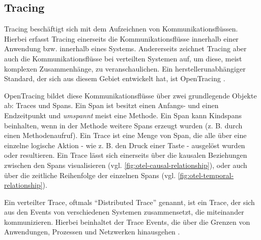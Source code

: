 
\subsection{Tracing}
\label{sec:tracing}

Tracing beschäftigt sich mit dem Aufzeichnen von Kommunikationsflüssen. Hierbei erfasst Tracing einerseits die Kommunikationsflüsse innerhalb einer Anwendung bzw. innerhalb eines Systems. Andererseits zeichnet Tracing aber auch die Kommunikationsflüsse bei verteilten Systemen auf, um diese, meist komplexen Zusammenhänge, zu veranschaulichen. Ein herstellerunabhängiger Standard, der sich aus diesem Gebiet entwickelt hat, ist OpenTracing \cite{OpenTracing}.

OpenTracing bildet diese Kommunikationsflüsse über zwei grundlegende Objekte ab: Traces und Spans. Ein Span ist besitzt einen Anfangs- und einen Endzeitpunkt und \textit{umspannt} meist eine Methode. Ein Span kann Kindspans beinhalten, wenn in der Methode weitere Spans erzeugt wurden (z. B. durch einen Methodenaufruf). Ein Trace ist eine Menge von Span, die alle über eine einzelne logische Aktion - wie z. B. den Druck einer Taste - ausgelöst wurden oder resultieren. Ein Trace lässt sich einerseits über die kausalen Beziehungen zwischen den Spans visualisieren (vgl. \autoref{fig:otel-causal-relationship}), oder auch über die zeitliche Reihenfolge der einzelnen Spans (vgl. \autoref{fig:otel-temporal-relationship}).

Ein verteilter Trace, oftmals \enquote{Distributed Trace} genannt, ist ein Trace, der sich aus den Events von verschiedenen Systemen zusammensetzt, die miteinander kommunizieren. Hierbei beinhaltet der Trace Events, die über die Grenzen von Anwendungen, Prozessen und Netzwerken hinausgehen \cite{OpenTracingSpecification}.


